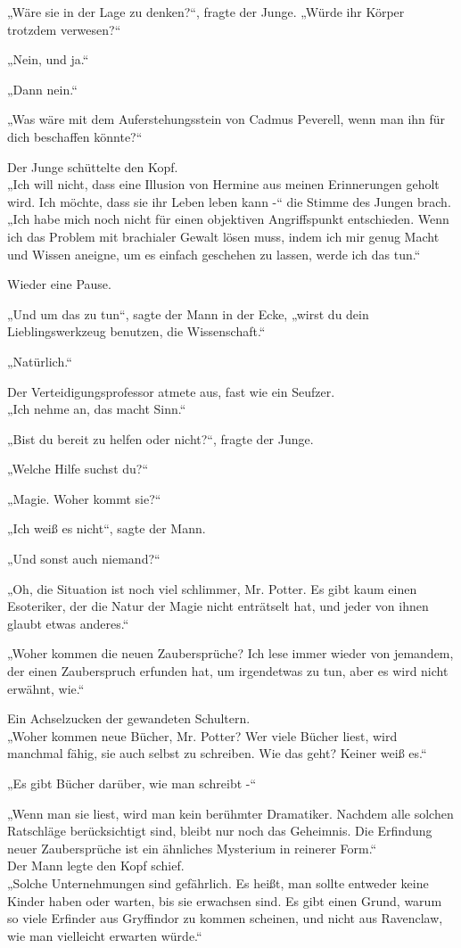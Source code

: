 {„Wäre sie in der Lage zu denken?“, fragte der Junge. „Würde ihr Körper trotzdem verwesen?“

„Nein, und ja.“

„Dann nein.“

„Was wäre mit dem Auferstehungsstein von Cadmus Peverell, wenn man ihn für dich beschaffen könnte?“

Der Junge schüttelte den Kopf.\\ „Ich will nicht, dass eine Illusion von Hermine aus meinen Erinnerungen geholt wird. Ich möchte, dass sie ihr Leben leben kann -“ die Stimme des Jungen brach. „Ich habe mich noch nicht für einen objektiven Angriffspunkt entschieden. Wenn ich das Problem mit brachialer Gewalt lösen muss, indem ich mir genug Macht und Wissen aneigne, um es einfach geschehen zu lassen, werde ich das tun.“

Wieder eine Pause.

„Und um das zu tun“, sagte der Mann in der Ecke, „wirst du dein Lieblingswerkzeug benutzen, die Wissenschaft.“

„Natürlich.“

Der Verteidigungsprofessor atmete aus, fast wie ein Seufzer.\\ „Ich nehme an, das macht Sinn.“

„Bist du bereit zu helfen oder nicht?“, fragte der Junge.

„Welche Hilfe suchst du?“

„Magie. Woher kommt sie?“

„Ich weiß es nicht“, sagte der Mann.

„Und sonst auch niemand?“

„Oh, die Situation ist noch viel schlimmer, Mr. Potter. Es gibt kaum einen Esoteriker, der die Natur der Magie nicht enträtselt hat, und jeder von ihnen glaubt etwas anderes.“

„Woher kommen die neuen Zaubersprüche? Ich lese immer wieder von jemandem, der einen Zauberspruch erfunden hat, um irgendetwas zu tun, aber es wird nicht erwähnt, wie.“

Ein Achselzucken der gewandeten Schultern.\\ „Woher kommen neue Bücher, Mr. Potter? Wer viele Bücher liest, wird manchmal fähig, sie auch selbst zu schreiben. Wie das geht? Keiner weiß es.“

„Es gibt Bücher darüber, wie man schreibt -“

„Wenn man sie liest, wird man kein berühmter Dramatiker. Nachdem alle solchen Ratschläge berücksichtigt sind, bleibt nur noch das Geheimnis. Die Erfindung neuer Zaubersprüche ist ein ähnliches Mysterium in reinerer Form.“\\ Der Mann legte den Kopf schief.\\ „Solche Unternehmungen sind gefährlich. Es heißt, man sollte entweder keine Kinder haben oder warten, bis sie erwachsen sind. Es gibt einen Grund, warum so viele Erfinder aus Gryffindor zu kommen scheinen, und nicht aus Ravenclaw, wie man vielleicht erwarten würde.“

}
